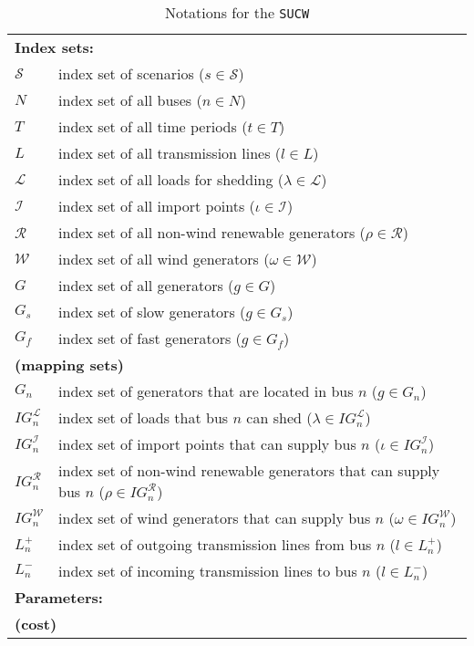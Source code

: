\begin{table}[]
	\centering
	\caption{Notations for the \texttt{SUCW}}
	\label{sucw:notation}
	\begin{tabular}{ll}
		\toprule
		\multicolumn{2}{l}{\textbf{Index sets:}} \\
		$\mathcal{S}$ & index set of scenarios ($s\in\mathcal{S}$) 		\\ 		
		$N$ & index set of all buses ($n\in N$)\\
		$T$ & index set of all time periods ($t\in T$)\\
		$L$ & index set of all transmission lines ($l\in L$) \\
		$\mathcal{L}$ & index set of all loads for shedding ($\lambda \in \mathcal{L}$)\\
		$\mathcal{I}$ & index set of all import points ($\iota\in \mathcal{I}$)\\
		$\mathcal{R}$ & index set of all non-wind renewable generators ($\rho\in \mathcal{R}$)\\
		$\mathcal{W}$ & index set of all wind generators ($\omega\in \mathcal{W}$)\\
		$G$ & index set of all generators ($g\in G$)\\
		$G_s$ & index set of slow generators ($g\in G_s$)\\
		$G_f$ & index set of fast generators ($g\in G_f$)\\
		\multicolumn{2}{l}{\textbf{(mapping sets)}} \\
		$G_n$ & index set of generators that are located in bus $n$ ($g\in G_n$)\\
		$IG_n^\mathcal{L}$ & index set of loads that bus $n$ can shed ($\lambda\in IG_n^\mathcal{L}$)\\
		$IG_n^\mathcal{I}$ & index set of import points that can supply bus $n$ ($\iota\in IG_n^\mathcal{I}$) \\
		$IG_n^\mathcal{R}$ & index set of non-wind renewable generators that can supply bus $n$ ($\rho\in IG_n^\mathcal{R}$) \\
		$IG_n^\mathcal{W}$ & index set of wind generators that can supply bus $n$ ($\omega\in IG_n^\mathcal{W}$)\\
		$L_n^{+}$ & index set of outgoing transmission lines from bus $n$ ($l\in L_n^+$)\\
		$L_n^{-}$ & index set of incoming transmission lines to bus $n$ ($l\in L_n^-$)\\ \midrule
		\multicolumn{2}{l}{\textbf{Parameters:}} \\
		\multicolumn{2}{l}{\textbf{(cost)}} \\

\end{tabular}
\end{table}
